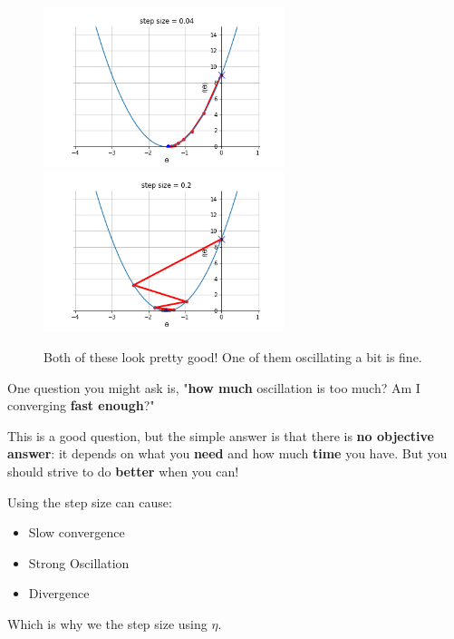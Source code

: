         \begin{figure}[H]
            \includegraphics[width=70mm,scale=0.5]{images/gradient_descent_images/good_converge.png}
            \includegraphics[width=70mm,scale=0.5]{images/gradient_descent_images/good_converge_oscillate.png}

            \caption*{Both of these look pretty good! One of them oscillating a bit is fine.}
        \end{figure}
        
        One question you might ask is, "\textbf{how much} oscillation is too much? Am I converging \textbf{fast enough}?" 
        
        This is a good question, but the simple answer is that there is \textbf{no objective answer}: it depends on what you \textbf{need} and how much \textbf{time} you have. But you should strive to do \textbf{better} when you can!\\
        
        \begin{concept}
            Using the  step size can cause:
            
            \begin{itemize}
                \item Slow convergence
                \item Strong Oscillation
                \item Divergence
            \end{itemize}
            
            Which is why we  the step size using $\eta$.
        \end{concept}
        
